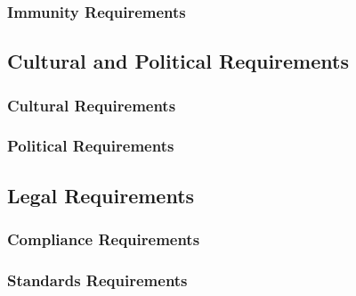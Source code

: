 \documentclass[12pt, titlepage]{article}
\begin{document}
    \subsubsection{Immunity Requirements}

  \subsection{Cultural and Political Requirements}

    \subsubsection{Cultural Requirements}
    \subsubsection{Political Requirements}

  \subsection{Legal Requirements}

    \subsubsection{Compliance Requirements}
    \subsubsection{Standards Requirements}
\end{document}
